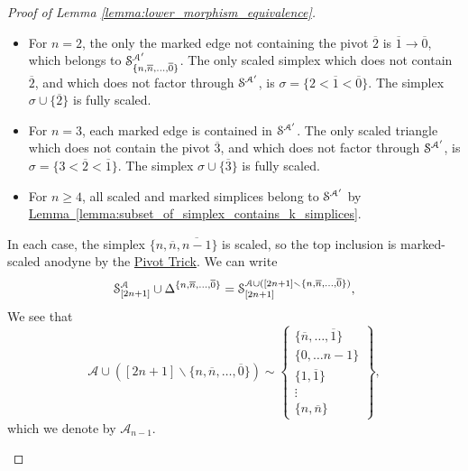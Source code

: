\documentclass[main.tex]{subfiles}
\begin{document}
\begin{proof}[Proof of Lemma \ref{lemma:lower_morphism_equivalence}]
\begin{enumerate}
\begin{itemize}
          \begin{itemize}
            \item For $n = 2$, the only the marked edge not containing the pivot $\overline{2}$ is $\overline{1} \to \overline{0}$, which belongs to $\S^{\mathcal{A}'}_{\{n, \overline{n}, \ldots, \overline{0}\}}$. The only scaled simplex which does not contain $\overline{2}$, and which does not factor through $\S^{\mathcal{A}'}$, is $\sigma = \{2 < \overline{1} < \overline{0}\}$. The simplex $\sigma \cup \{\overline{2}\}$ is fully scaled.

            \item For $n = 3$, each marked edge is contained in $\S^{\mathcal{A}'}$. The only scaled triangle which does not contain the pivot $\overline{3}$, and which does not factor through $\S^{\mathcal{A}'}$, is $\sigma = \{3 < \overline{2} < \overline{1}\}$. The simplex $\sigma \cup \{\overline{3}\}$ is fully scaled.

            \item For $n \geq 4$, all scaled and marked simplices belong to $\S^{\mathcal{A}'}$ by \hyperref[lemma:subset_of_simplex_contains_k_simplices]{Lemma~\ref*{lemma:subset_of_simplex_contains_k_simplices}}.
          \end{itemize}
          In each case, the simplex $\{n, \overline{n}, \overline{n-1}\}$ is scaled, so the top inclusion is marked-scaled anodyne by the \hyperref[lemma:pivot_trick]{Pivot Trick}. We can write
          \begin{equation*}
            \S^{\mathcal{A}}_{[2n+1]} \cup \Delta^{\{n, \overline{n}, \ldots, \overline{0}\}} = \S^{\mathcal{A} \cup ([2n+1] \smallsetminus \{n, \overline{n}, \ldots, \overline{0}\})}_{[2n+1]},
          \end{equation*}
          We see that
          \begin{equation*}
            \mathcal{A} \cup ([2n+1] \smallsetminus \{n, \overline{n}, \ldots, \overline{0}\}) \sim \left\{ \substack{ \{\overline{n}, \ldots, \overline{1}\} \\ \{0, \ldots n-1\} \\ \{1, \overline{1}\} \\ \vdots \\ \{n, \overline{n}\} } \right\},
          \end{equation*}
          which we denote by $\mathcal{A}_{n-1}$.


\end{itemize}
\end{enumerate}
\end{proof}
\end{document}

